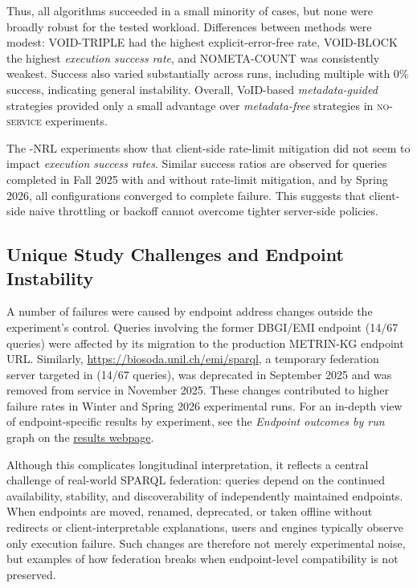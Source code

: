 \documentclass[runningheads]{llncs}
\begin{document}
Thus, all algorithms succeeded in a small minority of cases, but none were broadly robust for the tested workload. 
Differences between methods were modest: \textsc{VOID-TRIPLE} had the highest explicit-error-free rate, \textsc{VOID-BLOCK} the highest \emph{execution success rate}, and \textsc{NOMETA-COUNT} was consistently weakest. 
Success also varied substantially across runs, including multiple with \(0\%\) success, indicating general instability. 
Overall, VoID-based \textit{metadata-guided} strategies provided only a small advantage over \textit{metadata-free} strategies in \textsc{no-service} experiments.

The \textsc{-NRL} experiments show that client-side rate-limit mitigation did not seem to impact \emph{execution success rates}. 
Similar success ratios are observed for queries completed in Fall 2025 with and without rate-limit mitigation, and by Spring 2026, all configurations converged to complete failure. 
This suggests that client-side naive throttling or backoff cannot overcome tighter server-side policies.


\subsection{Unique Study Challenges and Endpoint Instability}\label{sec5.5}
A number of failures were caused by endpoint address changes outside the experiment’s control. 
Queries involving the former DBGI/EMI endpoint (14/67 queries) were affected by its migration to the production METRIN-KG endpoint URL. 
Similarly, \url{https://biosoda.unil.ch/emi/sparql}, a temporary federation server targeted in (14/67 queries), was deprecated in September 2025 and was removed from service in November 2025. 
These changes contributed to higher failure rates in Winter and Spring 2026 experimental runs.
For an in-depth view of endpoint-specific results by experiment, see the \textit{Endpoint outcomes by run} graph on the \href{https://ecrum19.github.io/fed-survey-results/}{results webpage}.

Although this complicates longitudinal interpretation, it reflects a central challenge of real-world SPARQL federation: queries depend on the continued availability, stability, and discoverability of independently maintained endpoints. 
When endpoints are moved, renamed, deprecated, or taken offline without redirects or client-interpretable explanations, users and engines typically observe only execution failure. 
Such changes are therefore not merely experimental noise, but examples of how federation breaks when endpoint-level compatibility is not preserved.
\end{document}
